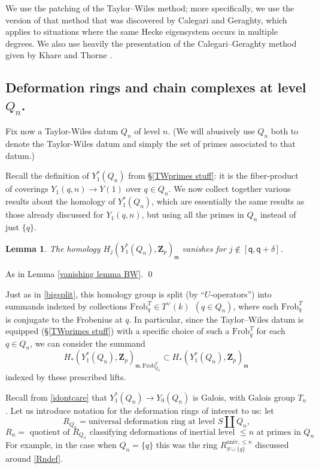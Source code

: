 \documentclass[10pt]{amsart}
\newcommand{\Z}{\mathbf{Z}}
\newcommand{\univ}{\mathrm{univ}}
\newcommand{\Frob}{\mathrm{Frob}}
\newcommand{\ramprimes}{S}
\newtheorem{lemma}[subsection]{Lemma}
\theoremstyle{remark}
\newcommand{\BWq}{\mathsf{q}}
\begin{document}
We use the patching of the Taylor--Wiles method; more specifically, we use the 
version of that method  that was discovered \cite{CG} by Calegari and Geraghty,
which applies to situations where the same Hecke eigensystem occurs in multiple degrees.
We also use heavily the presentation of the Calegari--Geraghty method 
given by Khare and Thorne \cite{KT}. 
\subsection{Deformation rings and chain complexes at level $Q_n$.}  \label{Qnchain}

 Fix now a Taylor-Wiles datum $Q_n$ of level $n$. 
  (We will   abusively use $Q_n$ both to denote the Taylor-Wiles datum and simply the set of primes associated to that datum.)
  
  Recall the definition of $Y_1^*(Q_n)$ from \S \ref{TWprimes stuff}: it is the fiber-product of coverings $Y_1(q, n) \rightarrow Y(1)$
  over $q \in Q_n$. 
 We now collect together various results about the homology of $Y_1^*(Q_n)$, which are essentially the same
 results as those already discussed for $Y_1(q,n)$, but using all the primes in $Q_n$ instead of just $\{q\}$. 
 
 
 \begin{lemma} The homology $H_j(Y_1^*(Q_n), \Z_p)_{\mathfrak{m}}$
  vanishes for $j \notin [\BWq, \BWq+\delta]$. 
 \end{lemma} 
 \proof As in Lemma \ref{vanishing lemma BW}. \qed
 
 Just as in \eqref{bigsplit}, this homology group is split (by ``$U$-operators'') into summands
 indexed by collections $\Frob^T_q \in T^{\vee}(k) \ \ (q \in Q_n)$, where each $\Frob^T_q$
 is conjugate to the Frobenius at $q$. 
  In particular, since the Taylor--Wiles datum is equipped (\S \ref{TWprimes stuff}) with a specific choice of such a $\Frob_q^T$ for each $q \in Q_n$, we
  can consider  the summand 
\begin{equation} \label{Weylsplitting}  H_*(Y_1^*(Q_n), \Z_p)_{\mathfrak{m},\Frob^T_{Q_n}}  \subset H_*(Y_1^*(Q_n), \Z_p)_{\mathfrak{m}}  \end{equation}
indexed by  these prescribed lifts. 

  Recall  from \eqref{idontcare}  that $Y_1^*(Q_n) \rightarrow Y_0(Q_n)$ is Galois, with Galois group $T_n$.    
Let us introduce notation for the deformation rings of interest to us: let 
 $$R_{Q_n} = \mbox{universal deformation ring at level $\ramprimes \coprod Q_n$,}$$
 \begin{equation} \label{RnRn}  R_n = \mbox{ quotient of $R_{Q_n}$ classifying   deformations of inertial level $\leq n$ at primes in $Q_n$}
 \end{equation}
  For example,  in the case when $Q_n = \{q\}$ this was the ring $R^{\univ,\leq n}_{\ramprimes \cup \{q\}}$ discussed around \eqref{Rndef}.  
 
\end{document}
